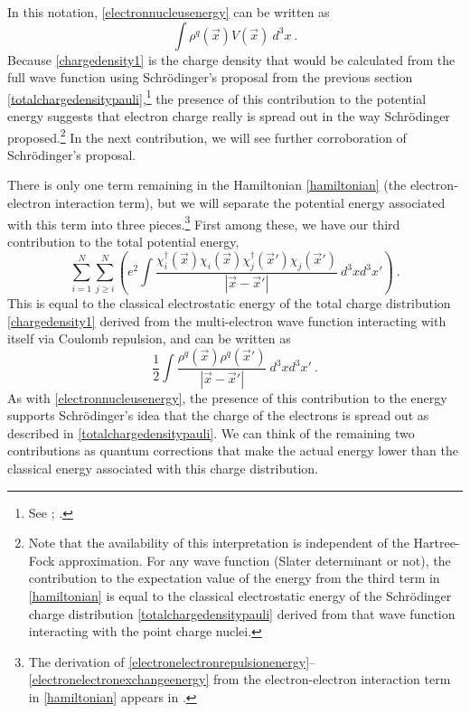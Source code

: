 \documentclass[12pt,onecolumn,secnumarabic,amsmath,amssymb,balancelastpage,nofootinbib]{article}
\begin{document}
In this notation, \eqref{electronnucleusenergy} can be written as
\begin{equation}
\int{\rho^q(\vec{x}) V(\vec{x}) \  d^3 x}
\ .
\label{electronnucleusenergy2}
\end{equation}
Because \eqref{chargedensity1} is the charge density that would be calculated from the full wave function using Schr\"{o}dinger's proposal from the previous section \eqref{totalchargedensitypauli},\footnote{See \cite[pg.\ 9]{bader1990}; \cite[problem 16.28]{levineQC}.}  the presence of this contribution to the potential energy suggests that electron charge really is spread out in the way Schr\"{o}dinger proposed.\footnote{Note that the availability of this interpretation is independent of the Hartree-Fock approximation.  For any wave function (Slater determinant or not), the contribution to the expectation value of the energy from the third term in \eqref{hamiltonian} is equal to the classical electrostatic energy of the Schr\"{o}dinger charge distribution \eqref{totalchargedensitypauli} derived from that wave function interacting with the point charge nuclei.}  In the next contribution, we will see further corroboration of Schr\"{o}dinger's proposal.

There is only one term remaining in the Hamiltonian \eqref{hamiltonian} (the electron-electron interaction term), but we will separate the potential energy associated with this term into three pieces.\footnote{The derivation of \eqref{electronelectronrepulsionenergy}--\eqref{electronelectronexchangeenergy} from the electron-electron interaction term in \eqref{hamiltonian} appears in \cite{blinder1965}.}  First among these, we have our third contribution to the total potential energy,
\begin{equation}
\sum_{i=1}^{N}\sum_{j \geq i}^{N}\left(e^2\int{\frac{\chi_i^{\dagger}(\vec{x})\chi_i(\vec{x})\chi_j^{\dagger}(\vec{x}')\chi_j(\vec{x}')}{|\vec{x}-\vec{x}'|}\  d^3 x d^3 x'}\right)
\ .
\label{electronelectronrepulsionenergy}
\end{equation}
This is equal to the classical electrostatic energy of the total charge distribution \eqref{chargedensity1} derived from the multi-electron wave function interacting with itself via Coulomb repulsion, and can be written as
\begin{equation}
\frac{1}{2}\int{\frac{\rho^q(\vec{x}) \rho^q(\vec{x}')}{|\vec{x}-\vec{x}'|}\  d^3 x d^3 x'}
\ .
\label{electronelectronrepulsionenergy2}
\end{equation}
As with \eqref{electronnucleusenergy}, the presence of this contribution to the energy supports Schr\"{o}dinger's idea that the charge of the electrons is spread out as described in \eqref{totalchargedensitypauli}.  We can think of the remaining two contributions as quantum corrections that make the actual energy lower than the classical energy associated with this charge distribution.
\end{document}
